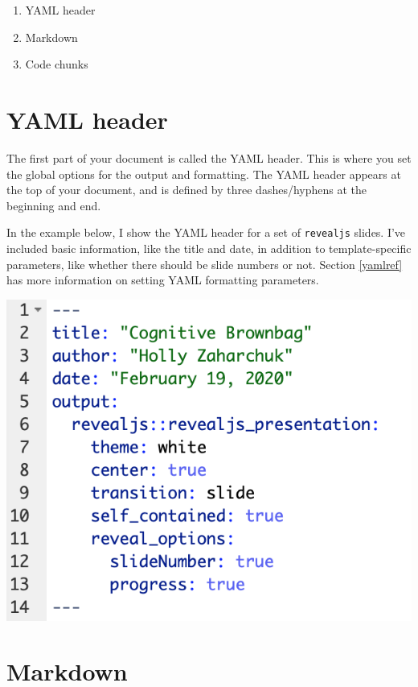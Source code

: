 \documentclass[
]{book}
\providecommand{\tightlist}{%
  \setlength{\itemsep}{0pt}\setlength{\parskip}{0pt}}
\begin{document}
\begin{enumerate}
\def\labelenumi{\arabic{enumi}.}
\tightlist
\item
  YAML header
\item
  Markdown
\item
  Code chunks
\end{enumerate}

\hypertarget{yaml-header}{%
\section{YAML header}\label{yaml-header}}

The first part of your document is called the YAML header. This is where you set the global options for the output and formatting. The YAML header appears at the top of your document, and is defined by three dashes/hyphens at the beginning and end.

In the example below, I show the YAML header for a set of \texttt{revealjs} slides. I've included basic information, like the title and date, in addition to template-specific parameters, like whether there should be slide numbers or not. Section \ref{yamlref} has more information on setting YAML formatting parameters.

\includegraphics[width=8.39in]{images/example_yaml}

\hypertarget{markintro}{%
\section{Markdown}\label{markintro}}
\end{document}
